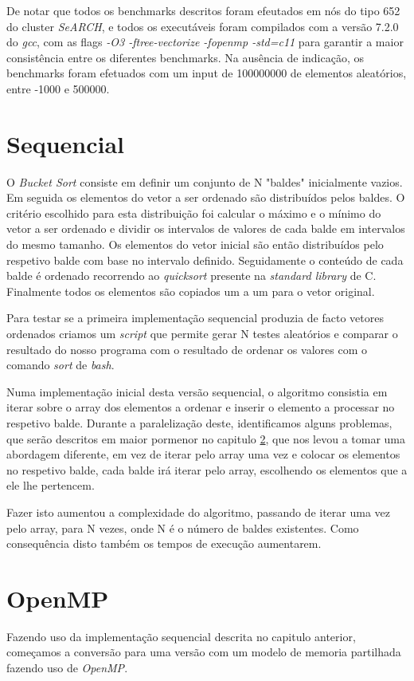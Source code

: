 \documentclass[a4paper]{report}
\begin{document}
De notar que todos os benchmarks descritos foram efeutados em nós do tipo 652 do
cluster \textit{SeARCH}, e todos os executáveis foram compilados com a versão
7.2.0 do \textit{gcc}, com as flags \textit{-O3 -ftree-vectorize -fopenmp
-std=c11} para garantir a maior consistência entre os diferentes benchmarks. Na
ausência de indicação, os benchmarks foram efetuados com um input de 100000000
de elementos aleatórios, entre -1000 e 500000.

\chapter{Sequencial}
O \textit{Bucket Sort} consiste em definir um conjunto de N "baldes"
inicialmente vazios. Em seguida os elementos do vetor a ser ordenado são
distribuídos pelos baldes. O critério escolhido para esta distribuição foi
calcular o máximo e o mínimo do vetor a ser ordenado e dividir os intervalos de
valores de cada balde em intervalos do mesmo tamanho. Os elementos do vetor
inicial são então distribuídos pelo respetivo balde com base no intervalo
definido. Seguidamente o conteúdo de cada balde é ordenado recorrendo ao
\textit{quicksort} presente na \textit{standard library} de C. Finalmente todos
os elementos são copiados um a um para o vetor original.

Para testar se a primeira implementação sequencial produzia de facto vetores
ordenados criamos um \textit{script} que permite gerar N testes aleatórios e
comparar o resultado do nosso programa com o resultado de ordenar os valores
com o comando \textit{sort} de \textit{bash}.

Numa implementação inicial desta versão sequencial, o algoritmo consistia em
iterar sobre o array dos elementos a ordenar e inserir o elemento a processar no
respetivo balde. Durante a paralelização deste, identificamos alguns problemas,
que serão descritos em maior pormenor no capitulo \ref{chap:omp}, que nos levou
a tomar uma abordagem diferente, em vez de iterar pelo array uma vez e colocar
os elementos no respetivo balde, cada balde irá iterar pelo array, escolhendo os
elementos que a ele lhe pertencem.

Fazer isto aumentou a complexidade do algoritmo, passando de iterar uma vez pelo
array, para N vezes, onde N é o número de baldes existentes. Como
consequência disto também os tempos de execução aumentarem.

\chapter{OpenMP} \label{chap:omp}
Fazendo uso da implementação sequencial descrita no capitulo anterior, começamos
a conversão para uma versão com um modelo de memoria partilhada fazendo uso de
\textit{OpenMP}.
\end{document}
